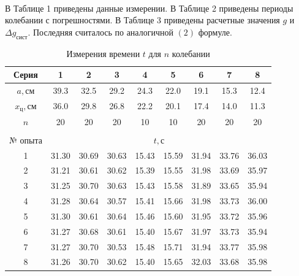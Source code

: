 \documentclass[a4paper, 12pt]{article}
\begin{document}
    \paragraph{}
    В Таблице 1 приведены данные измерении. В Таблице 2 приведены периоды колебании с погрешностями. В Таблице 3 приведены расчетные значения $g$ и $\Delta g_{сист}$. Последняя считалось по аналогичной $(2)$ формуле.
    \vspace{1cm}
    \begin{table}[h!]
        \begin{center}

         \begin{tabular}{|c|c|c|c|c|c|c|c|c|}
            \hline
            \textbf{Серия} & \textbf{1} & \textbf{2} & \textbf{3} & \textbf{4} & \textbf{5} & \textbf{6} & \textbf{7} & \textbf{8}\\
            \hline
            \textbf{$a, см$} & 39.3 & 32.5 & 29.2 & 24.3 & 22.0 & 19.1 & 15.3 & 12.4\\
            \hline
            \textbf{$x_ц, см$} & 36.0 & 29.8 & 26.8 & 22.2 & 20.1 & 17.4 & 14.0 & 11.3\\
            \hline
            \textbf{$n$} & 20 & 20 & 20 & 10 & 10 & 20 & 20 & 20\\
            \hline
            \multicolumn{9}{c}{  } \\
            \hline
            № опыта & \multicolumn{8}{c|}{$t, с$} \\
            \hline
            1 & 31.30 & 30.69 & 30.63 & 15.43 & 15.59 & 31.94 & 33.76 & 36.03 \\
            2 & 31.21 & 30.61 & 30.62 & 15.39 & 15.55 & 31.98 & 33.69 & 35.97 \\
            3 & 31.25 & 30.70 & 30.63 & 15.43 & 15.58 & 31.89 & 33.65 & 35.94 \\
            4 & 31.28 & 30.64 & 30.57 & 15.41 & 15.66 & 31.98 & 33.73 & 36.00 \\
            5 & 31.30 & 30.61 & 30.64 & 15.46 & 15.60 & 31.95 & 33.72 & 35.96 \\
            6 & 31.27 & 30.68 & 30.61 & 15.40 & 15.67 & 31.97 & 33.73 & 35.94 \\
            7 & 31.27 & 30.70 & 30.53 & 15.48 & 15.71 & 31.94 & 33.77 & 35.98 \\
            8 & 31.26 & 30.70 & 30.62 & 15.40 & 15.65 & 32.03 & 33.68 & 35.98 \\
            \hline
         \end{tabular}
         \caption{Измерения времени $t$ для $n$ колебании}
        \end{center}

    \end{table}
\end{document}
